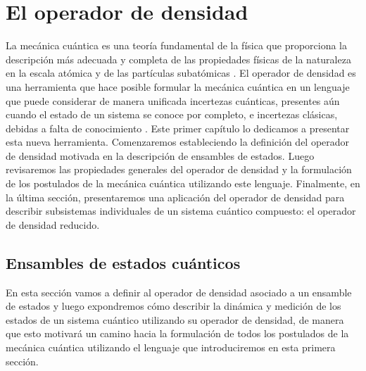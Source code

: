 \chapter{El operador de densidad} %
La mecánica cuántica es una teoría fundamental de la física que
proporciona la descripción más adecuada y completa de las propiedades
físicas de la naturaleza en la escala atómica y de las partículas 
subatómicas \cite{feynman1965feyman}. 
El operador de densidad es una herramienta
que hace posible formular la mecánica cuántica en un lenguaje
que puede considerar de manera unificada incertezas 
cuánticas, 
presentes aún cuando el estado de un sistema se conoce 
por completo, e incertezas clásicas, 
debidas a falta de conocimiento \cite{sakurai_napolitano_2017}.
Este primer capítulo lo dedicamos a presentar esta nueva herramienta.
Comenzaremos estableciendo la definición del operador de densidad
motivada en la descripción de ensambles de estados. Luego
revisaremos las propiedades generales del operador de densidad y la 
formulación de los postulados de la mecánica cuántica utilizando este
lenguaje. Finalmente, en la última sección, presentaremos una aplicación 
del operador de densidad para describir subsistemas individuales 
de un sistema cuántico compuesto: el operador de densidad reducido.


\section{Ensambles de estados cuánticos} %
En esta sección vamos a definir al operador de densidad asociado a 
un ensamble de estados y luego expondremos cómo describir la dinámica
y medición de los estados de un sistema cuántico utilizando 
su operador de densidad, 
de manera que esto motivará un camino hacia la formulación
de todos los postulados de la mecánica cuántica utilizando el
lenguaje que introduciremos en esta primera sección.

